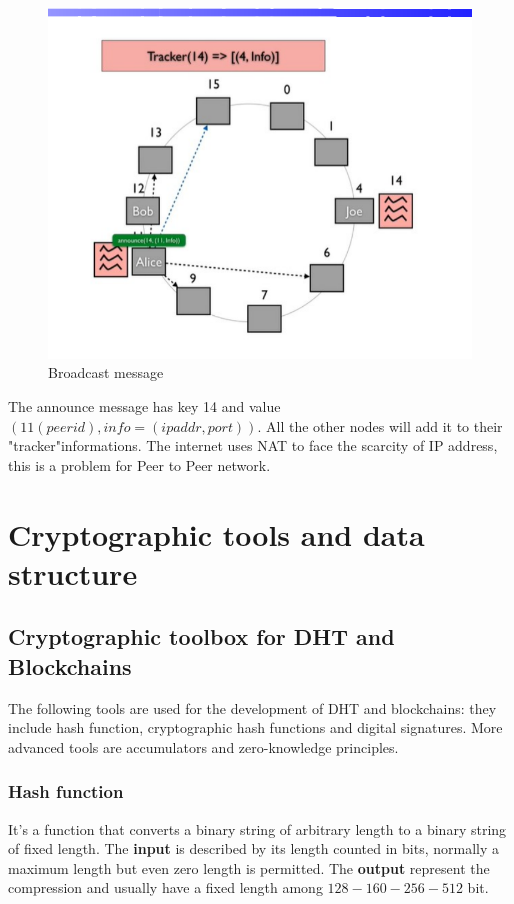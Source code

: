 \documentclass[10pt,a4paper]{report}
\begin{document}
\begin{figure}
	\centering
	\includegraphics[scale=0.60]{images/Pasted image 20230311111432.png}
	\caption[scale=0.50]{Broadcast message}
	\label{alice-exchange}
\end{figure}

The announce message has key 14 and value $(11(peerid),info=(ipaddr,port))$. All the other nodes will add it to their "tracker"informations. The internet uses NAT to face the scarcity of IP address, this is a problem for Peer to Peer network.



\chapter{Cryptographic tools and data structure}


\section{Cryptographic toolbox for DHT and Blockchains}\label{sec:cryptographic-toolbox-for-dht-and-blockchains}
The following tools are used for the development of DHT and blockchains: they include hash function, cryptographic hash functions and digital signatures. More advanced tools are accumulators and zero-knowledge principles.
\subsection{Hash function}\label{sec:hash-function}
It's a function that converts a binary string of arbitrary length to a binary string of fixed length. The \textbf{input} is described by its length counted in bits, normally a maximum length but even zero length is permitted.
The \textbf{output} represent the compression and usually have a fixed length among $128-160-256-512$ bit.
\end{document}
